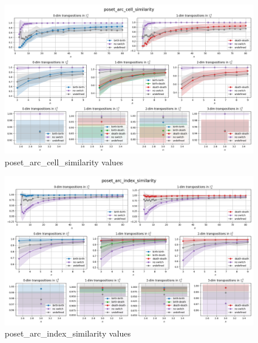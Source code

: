 \documentclass{article}
\begin{document}
\begin{figure}[h!]
    \hspace*{-3cm}
    \centering
    \includegraphics[width=1.5\textwidth]{pics/torus-transpositions/similaritites/score=poset-arc-cell-similarity.png}
    \caption{poset\_arc\_cell\_similarity values}
    \label{fig:poset-arc-cell-similarity}
\end{figure}
\begin{figure}[h!]
    \hspace*{-3cm}
    \centering
    \includegraphics[width=1.5\textwidth]{pics/torus-transpositions/similaritites/score=poset-arc-index-similarity.png}
    \caption{poset\_arc\_index\_similarity values}
    \label{fig:poset-arc-index-similarity}
\end{figure}
\end{document}
